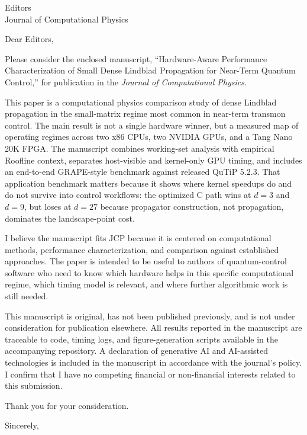 \documentclass[11pt]{letter}
\begin{document}
\begin{letter}{Editors\\Journal of Computational Physics}

\opening{Dear Editors,}

Please consider the enclosed manuscript, ``Hardware-Aware Performance
Characterization of Small Dense Lindblad Propagation for Near-Term Quantum
Control,'' for publication in the \textit{Journal of Computational Physics}.

This paper is a computational physics comparison study of dense Lindblad
propagation in the small-matrix regime most common in near-term transmon
control. The main result is not a single hardware winner, but a measured map
of operating regimes across two x86 CPUs, two NVIDIA GPUs, and a Tang Nano
20K FPGA. The manuscript combines working-set analysis with empirical
Roofline context, separates host-visible and kernel-only GPU timing, and
includes an end-to-end GRAPE-style benchmark against released QuTiP 5.2.3.
That application benchmark matters because it shows where kernel speedups do
and do not survive into control workflows: the optimized C path wins at
$d=3$ and $d=9$, but loses at $d=27$ because propagator construction, not
propagation, dominates the landscape-point cost.

I believe the manuscript fits JCP because it is centered on computational
methods, performance characterization, and comparison against established
approaches. The paper is intended to be useful to authors of quantum-control
software who need to know which hardware helps in this specific computational
regime, which timing model is relevant, and where further algorithmic work is
still needed.

This manuscript is original, has not been published previously, and is not
under consideration for publication elsewhere. All results reported in the
manuscript are traceable to code, timing logs, and figure-generation scripts
available in the accompanying repository. A declaration of generative AI and
AI-assisted technologies is included in the manuscript in accordance with the
journal's policy. I confirm that I have no competing financial or
non-financial interests related to this submission.

Thank you for your consideration.

\closing{Sincerely,}

\end{letter}
\end{document}
